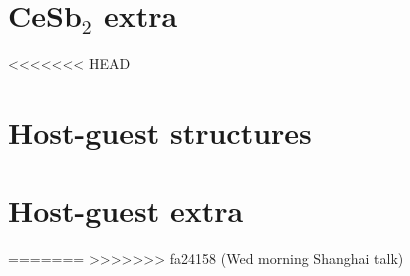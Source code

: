 \section{CeSb$_2$ extra}




<<<<<<< HEAD

\section{Host-guest structures}

\section{Host-guest extra}


=======
>>>>>>> fa24158 (Wed morning Shanghai talk)


% 


% 
% 

% 


% 


% 




